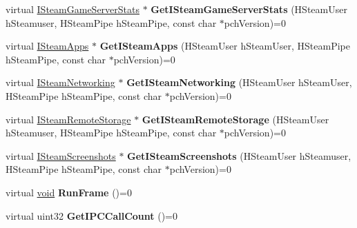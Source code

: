 \begin{DoxyCompactItemize}
\item 
\hypertarget{classISteamClient_a6316ed5714844a65a4ad92d12c935a91}{}virtual \hyperlink{classISteamGameServerStats}{I\+Steam\+Game\+Server\+Stats} $\ast$ {\bfseries Get\+I\+Steam\+Game\+Server\+Stats} (H\+Steam\+User h\+Steamuser, H\+Steam\+Pipe h\+Steam\+Pipe, const char $\ast$pch\+Version)=0\label{classISteamClient_a6316ed5714844a65a4ad92d12c935a91}

\item 
\hypertarget{classISteamClient_a24f3e6244221d1c0a88b012cb559431d}{}virtual \hyperlink{classISteamApps}{I\+Steam\+Apps} $\ast$ {\bfseries Get\+I\+Steam\+Apps} (H\+Steam\+User h\+Steam\+User, H\+Steam\+Pipe h\+Steam\+Pipe, const char $\ast$pch\+Version)=0\label{classISteamClient_a24f3e6244221d1c0a88b012cb559431d}

\item 
\hypertarget{classISteamClient_a5b6ec0445c5d2b201c1e288e4c3cce0f}{}virtual \hyperlink{classISteamNetworking}{I\+Steam\+Networking} $\ast$ {\bfseries Get\+I\+Steam\+Networking} (H\+Steam\+User h\+Steam\+User, H\+Steam\+Pipe h\+Steam\+Pipe, const char $\ast$pch\+Version)=0\label{classISteamClient_a5b6ec0445c5d2b201c1e288e4c3cce0f}

\item 
\hypertarget{classISteamClient_ae8f418face2268f97d3cc8bf3c218b3e}{}virtual \hyperlink{classISteamRemoteStorage}{I\+Steam\+Remote\+Storage} $\ast$ {\bfseries Get\+I\+Steam\+Remote\+Storage} (H\+Steam\+User h\+Steamuser, H\+Steam\+Pipe h\+Steam\+Pipe, const char $\ast$pch\+Version)=0\label{classISteamClient_ae8f418face2268f97d3cc8bf3c218b3e}

\item 
\hypertarget{classISteamClient_a49f324188e527bf77ec96550e3fed294}{}virtual \hyperlink{classISteamScreenshots}{I\+Steam\+Screenshots} $\ast$ {\bfseries Get\+I\+Steam\+Screenshots} (H\+Steam\+User h\+Steamuser, H\+Steam\+Pipe h\+Steam\+Pipe, const char $\ast$pch\+Version)=0\label{classISteamClient_a49f324188e527bf77ec96550e3fed294}

\item 
\hypertarget{classISteamClient_a6aff221d1b97839ebfc77a37709b34a8}{}virtual \hyperlink{SDL__audio_8h_a52835ae37c4bb905b903cbaf5d04b05f}{void} {\bfseries Run\+Frame} ()=0\label{classISteamClient_a6aff221d1b97839ebfc77a37709b34a8}

\item 
\hypertarget{classISteamClient_a65968ceb6cde78ac0f661d2560a71c1d}{}virtual uint32 {\bfseries Get\+I\+P\+C\+Call\+Count} ()=0\label{classISteamClient_a65968ceb6cde78ac0f661d2560a71c1d}


\end{DoxyCompactItemize}
